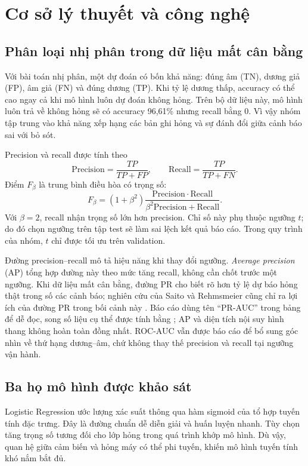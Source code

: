 \chapter{Cơ sở lý thuyết và công nghệ}
\section{Phân loại nhị phân trong dữ liệu mất cân bằng}
Với bài toán nhị phân, một dự đoán có bốn khả năng: đúng âm (TN), dương giả (FP), âm giả (FN) và đúng dương (TP). Khi tỷ lệ dương thấp, accuracy có thể cao ngay cả khi mô hình luôn dự đoán không hỏng. Trên bộ dữ liệu này, mô hình luôn trả về không hỏng sẽ có accuracy 96,61\% nhưng recall bằng 0. Vì vậy nhóm tập trung vào khả năng xếp hạng các bản ghi hỏng và sự đánh đổi giữa cảnh báo sai với bỏ sót.

Precision và recall được tính theo
\begin{equation}
\mathrm{Precision}=\frac{TP}{TP+FP},\qquad
\mathrm{Recall}=\frac{TP}{TP+FN}.
\end{equation}
Điểm $F_\beta$ là trung bình điều hòa có trọng số:
\begin{equation}
F_\beta=(1+\beta^2)\frac{\mathrm{Precision}\cdot\mathrm{Recall}}{\beta^2\mathrm{Precision}+\mathrm{Recall}}.
\end{equation}
Với $\beta=2$, recall nhận trọng số lớn hơn precision. Chỉ số này phụ thuộc ngưỡng $t$; do đó chọn ngưỡng trên tập test sẽ làm sai lệch kết quả báo cáo. Trong quy trình của nhóm, $t$ chỉ được tối ưu trên validation.

Đường precision--recall mô tả hiệu năng khi thay đổi ngưỡng. \emph{Average precision} (AP) tổng hợp đường này theo mức tăng recall, không cần chốt trước một ngưỡng. Khi dữ liệu mất cân bằng, đường PR cho biết rõ hơn tỷ lệ dự báo hỏng thật trong số các cảnh báo; nghiên cứu của Saito và Rehmsmeier cũng chỉ ra lợi ích của đường PR trong bối cảnh này \cite{saito2015}. Báo cáo dùng tên ``PR-AUC'' trong bảng để dễ đọc, song số liệu cụ thể được tính bằng ; AP và diện tích nội suy hình thang không hoàn toàn đồng nhất. ROC-AUC vẫn được báo cáo để bổ sung góc nhìn về thứ hạng dương--âm, chứ không thay thế precision và recall tại ngưỡng vận hành.

\section{Ba họ mô hình được khảo sát}
Logistic Regression ước lượng xác suất thông qua hàm sigmoid của tổ hợp tuyến tính đặc trưng. Đây là đường chuẩn dễ diễn giải và huấn luyện nhanh. Tùy chọn  tăng trọng số tương đối cho lớp hỏng trong quá trình khớp mô hình. Dù vậy, quan hệ giữa cảm biến và hỏng máy có thể phi tuyến, khiến mô hình tuyến tính khó nắm bắt đủ.

